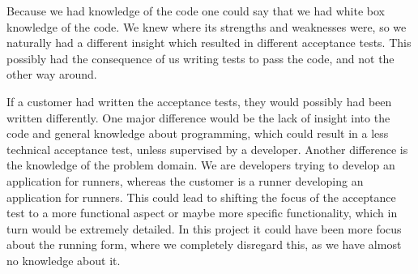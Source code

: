 Because we had knowledge of the code one could say that we had white box knowledge of the code.
We knew where its strengths and weaknesses were, so we naturally had a different insight which resulted in different acceptance tests.
This possibly had the consequence of us writing tests to pass the code, and not the other way around. 

If a customer had written the acceptance tests, they would possibly had been written differently. One major difference would be the lack of insight into the code and general knowledge about programming, which could result in a less technical acceptance test, unless supervised by a developer.
Another difference is the knowledge of the problem domain.
We are developers trying to develop an application for runners, whereas the customer is a runner developing an application for runners.
This could lead to shifting the focus of the acceptance test to a more functional aspect or maybe more specific functionality, which in turn would be extremely detailed. In this project it could have been more focus about the running form, where we completely disregard this, as we have almost no knowledge about it.
